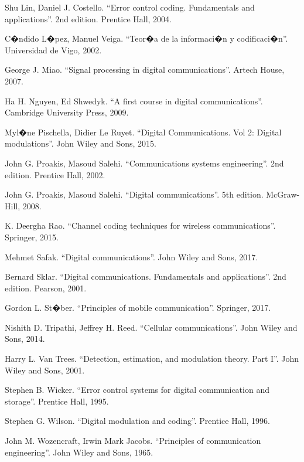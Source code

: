 \documentclass[es,apuntes]{uah}
\begin{document}
\begin{thebibliography}{100}
 Shu Lin, Daniel J. Costello. ``Error control coding. Fundamentals and applications''. 2nd edition. Prentice Hall, 2004.

 C�ndido L�pez, Manuel Veiga. ``Teor�a de la informaci�n y codificaci�n''. Universidad de Vigo, 2002.  

 George J. Miao. ``Signal processing in digital communications''. Artech House, 2007.

 Ha H. Nguyen, Ed Shwedyk. ``A first course in digital communications''. Cambridge University Press, 2009.

 Myl�ne Pischella, Didier Le Ruyet. ``Digital Communications. Vol 2: Digital modulations''. John Wiley and Sons, 2015.

 John G. Proakis, Masoud Salehi. ``Communications systems engineering''. 2nd edition. Prentice Hall, 2002. 

 John G. Proakis, Masoud Salehi. ``Digital communications''. 5th edition. McGraw-Hill, 2008.

 K. Deergha Rao. ``Channel coding techniques for wireless communications''. Springer, 2015. 

 Mehmet Safak. ``Digital communications''. John Wiley and Sons, 2017. 

 Bernard Sklar. ``Digital communications. Fundamentals and applications''. 2nd edition. Pearson, 2001. 

 Gordon L. St�ber. ``Principles of mobile communication''. Springer, 2017.

 Nishith D. Tripathi, Jeffrey H. Reed. ``Cellular communications''. John Wiley and Sons, 2014.

 Harry L. Van Trees. ``Detection, estimation, and modulation theory. Part I''. John Wiley and Sons, 2001.

 Stephen B. Wicker. ``Error control systems for digital communication and storage''. Prentice Hall, 1995.

 Stephen G. Wilson. ``Digital modulation and coding''. Prentice Hall, 1996.

 John M. Wozencraft, Irwin Mark Jacobs. ``Principles of communication engineering''. John Wiley and Sons, 1965.

\end{thebibliography}
\end{document}
